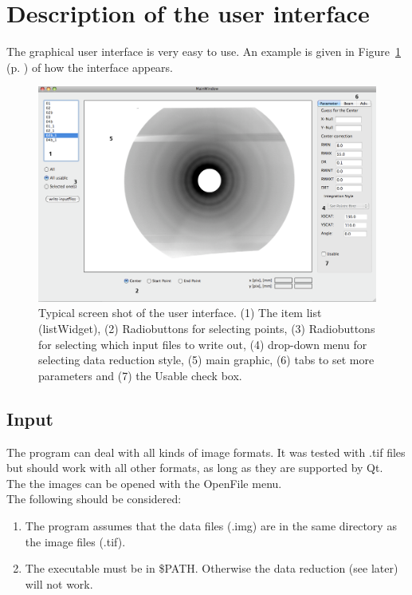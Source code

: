 \section{Description of the user interface}\label{interface} 
The graphical user interface is very easy to use. An example is given in Figure~\ref{ui} (p. \pageref{ui}) of how the interface appears. 

\begin{figure}
\includegraphics[width=20cm, angle=90]{ui.png}
\caption{Typical screen shot of the user interface. (1) The item list (listWidget), (2) Radiobuttons for selecting points, (3) Radiobuttons for selecting which input files to write out, (4) drop-down menu for selecting data reduction style, (5) main graphic, (6) tabs to set more parameters and (7) the Usable check box. }
\label{ui} 
\end{figure} 

\subsection{Input}
The program can deal with all kinds of image formats. It was tested with .tif files but should work with all other formats, as long as they are supported by Qt. \\
The the images can be opened with the OpenFile menu. \\
The following should be considered:
\begin{enumerate}
\item The program assumes that the data files (.img) are in the same directory as the image files (.tif). 
\item The executable must be in \$PATH. Otherwise the data reduction (see later) will not work. 
\end{enumerate}

